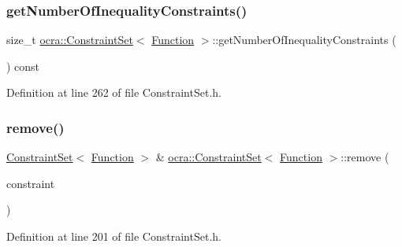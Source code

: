 \subsubsection{\texorpdfstring{get\+Number\+Of\+Inequality\+Constraints()}{getNumberOfInequalityConstraints()}}
{\footnotesize\ttfamily size\+\_\+t \hyperlink{classocra_1_1ConstraintSet}{ocra\+::\+Constraint\+Set}$<$ \hyperlink{classocra_1_1Function}{Function} $>$\+::get\+Number\+Of\+Inequality\+Constraints (\begin{DoxyParamCaption}{ }\end{DoxyParamCaption}) const\hspace{0.3cm}{\ttfamily [inline]}}



Definition at line 262 of file Constraint\+Set.\+h.

\hypertarget{classocra_1_1ConstraintSet_3_01Function_01_4_ab063f89bb8d35ae717a9d3dd7abe4582}{}\label{classocra_1_1ConstraintSet_3_01Function_01_4_ab063f89bb8d35ae717a9d3dd7abe4582} 
\subsubsection{\texorpdfstring{remove()}{remove()}\hspace{0.1cm}{\footnotesize\ttfamily [1/2]}}
{\footnotesize\ttfamily \hyperlink{classocra_1_1ConstraintSet}{Constraint\+Set}$<$ \hyperlink{classocra_1_1Function}{Function} $>$ \& \hyperlink{classocra_1_1ConstraintSet}{ocra\+::\+Constraint\+Set}$<$ \hyperlink{classocra_1_1Function}{Function} $>$\+::remove (\begin{DoxyParamCaption}\item[{\hyperlink{namespaceocra_af10341108ce661566aad00908668e2b1}{Generic\+Constraint} $\ast$}]{constraint }\end{DoxyParamCaption})\hspace{0.3cm}{\ttfamily [inline]}}



Definition at line 201 of file Constraint\+Set.\+h.

\hypertarget{classocra_1_1ConstraintSet_3_01Function_01_4_a9f745773b26cc27dc2f179392530529f}{}\label{classocra_1_1ConstraintSet_3_01Function_01_4_a9f745773b26cc27dc2f179392530529f} 
